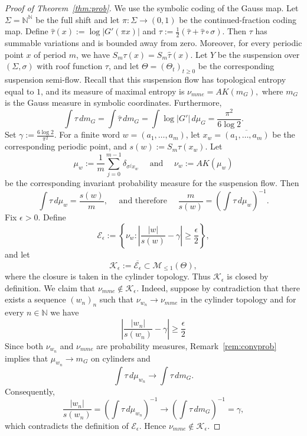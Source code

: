 \documentclass[10pt,a4paper]{amsart}
\newcommand{\N}{\mathbb{N}}
\def\ge{\geqslant}
\def\le{\leqslant}
\begin{document}
\begin{proof}[Proof of Theorem~\ref{thm:prob}]
We use the symbolic coding of the Gauss map. Let
\(\Sigma=\mathbb N^{\mathbb N}\) be the full shift and let
\(\pi:\Sigma\to(0,1)\) be the continued-fraction coding map. Define $\widehat\tau(x):=\log |G'(\pi x)|$ and
$\tau:=\frac12\left(\widehat\tau+\widehat\tau\circ\sigma\right)$. Then $\tau$ has summable variations and is bounded away from zero. Moreover, for every periodic point $x$ of period $m$, we have $S_m\tau(x)=S_m\widehat\tau(x)$.
Let $Y$ be the suspension over $(\Sigma,\sigma)$ with roof function $\tau$, and let $\Theta=(\Theta_t)_{t\ge0}$ be the corresponding suspension semi-flow. Recall that this suspension flow has topological entropy equal to $1$, and its measure of maximal entropy is $\nu_{mme}=AK(m_G),$
where $m_G$ is the Gauss measure in symbolic coordinates. Furthermore,
\[
\int \tau\,dm_G
=
\int \widehat\tau\,dm_G
=
\int \log |G'|\,d\mu_G
=
\frac{\pi^2}{6\log 2}.
\]
Set $\gamma:=\frac{6\log 2}{\pi^2}$. For a finite word $w=(a_1,\ldots,a_m)$, let $x_w=\overline{(a_1,\ldots,a_m)}$
be the corresponding periodic point, and $s(w):=S_m\tau(x_w).$
Let
\[
\mu_w:=\frac1m\sum_{j=0}^{m-1}\delta_{\sigma^j x_w}
\quad \text{ and } \quad \nu_w:=AK(\mu_w)
\]
be the corresponding invariant probability measure for the suspension flow. Then
\[
\int\tau\,d\mu_w=\frac{s(w)}{m},
\quad \text{ and therefore } \quad
\frac{m}{s(w)}
=
\left(\int\tau\,d\mu_w\right)^{-1}.
\]
Fix $\epsilon>0$. Define
\[
\mathcal E_\epsilon
:=
\left\{
\nu_w:
\left|
\frac{|w|}{s(w)}-\gamma
\right|
\ge \frac{\epsilon}{2}
\right\},
\]
and let
\[
\mathcal K_\epsilon
:=
\overline{\mathcal E_\epsilon}
\subset \mathcal M_{\le1}(\Theta),
\]
where the closure is taken in the cylinder topology. Thus
\(\mathcal K_\epsilon\) is closed by definition.
We claim that $\nu_{mme}\notin \mathcal K_\epsilon$.
Indeed, suppose by contradiction that there exists a sequence $(w_n)_n$ such that $\nu_{w_n}\to\nu_{mme}$
in the cylinder topology and for every $n \in \N$ we have
\[
\left|
\frac{|w_n|}{s(w_n)}-\gamma
\right|
\ge \frac{\epsilon}{2}
\]
Since both $\nu_{w_n}$ and $\nu_{mme}$ are probability measures, Remark~\ref{rem:convprob} implies that
$\mu_{w_n}\to m_G$ on cylinders and
\[
\int\tau\,d\mu_{w_n}
\longrightarrow
\int\tau\,dm_G .
\]
Consequently,
\[
\frac{|w_n|}{s(w_n)}
=
\left(\int\tau\,d\mu_{w_n}\right)^{-1}
\longrightarrow
\left(\int\tau\,dm_G\right)^{-1}
=
\gamma,
\]
which contradicts the definition of \(\mathcal E_\epsilon\). Hence
\(\nu_{mme}\notin\mathcal K_\epsilon\).


\end{proof}
\end{document}
